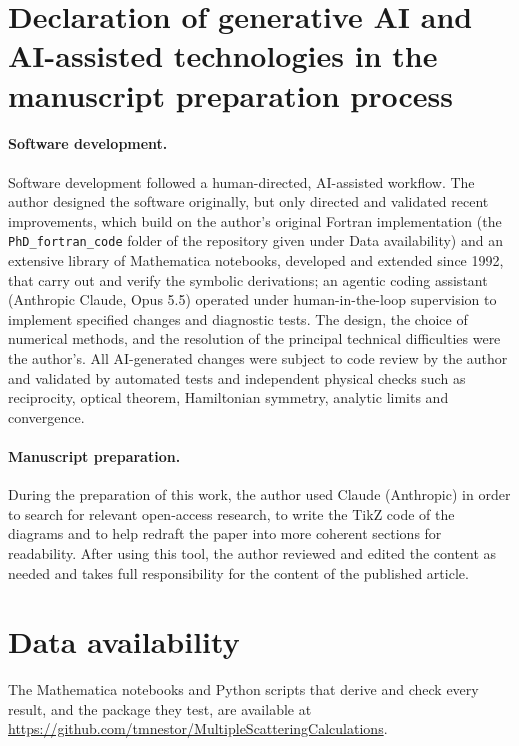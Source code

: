 \documentclass[preprint,review,12pt]{elsarticle}
\begin{document}
\section*{Declaration of generative AI and AI-assisted technologies in the manuscript preparation process}
\paragraph{Software development.} Software development followed a human-directed, AI-assisted workflow.
The author designed the software originally, but only directed and validated recent improvements, which
build on the author's original Fortran implementation (the \texttt{PhD\_fortran\_code} folder of the
repository given under Data availability) and an extensive library of Mathematica notebooks, developed
and extended since 1992, that carry out and verify the symbolic derivations; an agentic coding assistant
(Anthropic Claude, Opus 5.5) operated under human-in-the-loop supervision to implement specified changes
and diagnostic tests. The design, the choice of numerical methods, and the resolution of the principal
technical difficulties were the author's. All AI-generated changes were subject to code review by the
author and validated by automated tests and independent physical checks such as reciprocity, optical
theorem, Hamiltonian symmetry, analytic limits and convergence.

\paragraph{Manuscript preparation.} During the preparation of this work, the author used Claude
(Anthropic) in order to search for relevant open-access research, to write the TikZ code of the diagrams
and to help redraft the paper into more coherent sections for readability. After using this tool, the
author reviewed and edited the content as needed and takes full responsibility for the content of the
published article.

\section*{Data availability}
The Mathematica notebooks and Python scripts that derive and check every result, and the package they
test, are available at \url{https://github.com/tmnestor/MultipleScatteringCalculations}.



\end{document}
